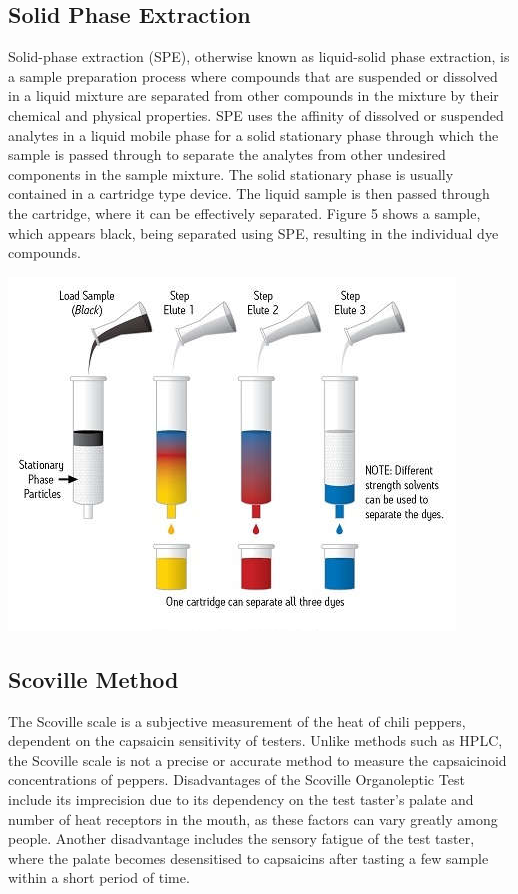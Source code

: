 \documentclass{article}
\begin{document}
\begin{multicols}{2}
{\subsection*{Solid Phase Extraction}
Solid-phase extraction (SPE), otherwise known as liquid-solid phase extraction,
    is a sample preparation process where compounds that are suspended or dissolved
    in a liquid mixture are separated from other compounds in the mixture by their
    chemical and physical properties. SPE uses the affinity of dissolved or
    suspended analytes in a liquid mobile phase for a solid stationary phase through
    which the sample is passed through to separate the analytes from other undesired
    components in the sample mixture.  The solid stationary phase is usually
    contained in a cartridge type device. The liquid sample is then passed through
    the cartridge, where it can be effectively separated.
    Figure 5 shows a sample, which appears black, being separated using SPE,
    resulting in the individual dye compounds.
    \begin{center}
        \includegraphics[scale=0.4]{spe}
    \end{center}

\subsection*{Scoville Method}
The Scoville scale is a subjective measurement of the heat of chili peppers,
    dependent on the capsaicin sensitivity of testers. Unlike methods such as HPLC,
    the Scoville scale is not a precise or accurate method to measure the capsaicinoid
    concentrations of peppers. Disadvantages of the Scoville Organoleptic Test include its
    imprecision due to its dependency on the test taster's palate and number of
    heat receptors in the mouth, as these factors can vary greatly among people. Another
    disadvantage includes the sensory fatigue of the test taster, where the palate
    becomes desensitised to capsaicins after tasting a few sample within a short
    period of time.

}
\end{multicols}
\end{document}
